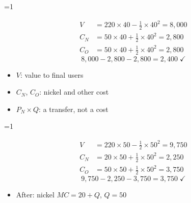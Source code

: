 \documentclass{beamer}
\newcommand{\showanswers}{0}
\begin{document}
\ifnum\showanswers=1
\begin{frame}[plain,label=w2_ans_q33c1]
  \Large
  \begin{align*}
    \tag{M55}\;V &= 220 \times 40 - \tfrac{1}{2} \times 40^2 = 8{,}000\\
    \tag{M56}\;C_N &= 50 \times 40 + \tfrac{1}{2} \times 40^2 = 2{,}800\\
    \tag{M57}\;C_O &= 50 \times 40 + \tfrac{1}{2} \times 40^2 = 2{,}800
  \end{align*}
  \[
    \tag{M58}\;8{,}000 - 2{,}800 - 2{,}800 = 2{,}400 \;\checkmark
  \]

  \vspace{0.3em}
  \begin{itemize}\Large
    \item $V$: value to final users
    \item $C_N$, $C_O$: nickel and other cost
    \item $P_N \times Q$: a transfer, not a cost
  \end{itemize}
\end{frame}
\fi

\ifnum\showanswers=1
\begin{frame}[plain,label=w2_ans_q33c2]
  \Large
  \begin{align*}
    \tag{M59}\;V &= 220 \times 50 - \tfrac{1}{2} \times 50^2 = 9{,}750\\
    \tag{M60}\;C_N &= 20 \times 50 + \tfrac{1}{2} \times 50^2 = 2{,}250\\
    \tag{M61}\;C_O &= 50 \times 50 + \tfrac{1}{2} \times 50^2 = 3{,}750
  \end{align*}
  \[
    \tag{M62}\;9{,}750 - 2{,}250 - 3{,}750 = 3{,}750 \;\checkmark
  \]

  \vspace{0.3em}
  \begin{itemize}\Large
    \item After: nickel $MC = 20 + Q$, $Q = 50$
  \end{itemize}
\end{frame}
\fi
\end{document}

